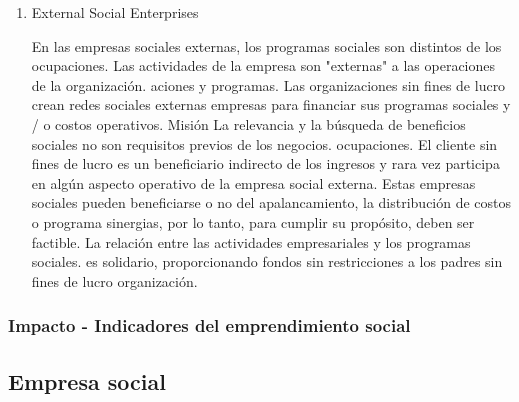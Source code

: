 \documentclass[11pt]{article}
\begin{document}
\begin{enumerate}
\item External Social Enterprises
\label{sec:orgd6ea4dd}

En las empresas sociales externas, los programas sociales son distintos de los
ocupaciones. Las actividades de la empresa son "externas" a las operaciones de la organización.
aciones y programas. Las organizaciones sin fines de lucro crean redes sociales externas
empresas para financiar sus programas sociales y / o costos operativos. Misión
La relevancia y la búsqueda de beneficios sociales no son requisitos previos de los negocios.
ocupaciones. El cliente sin fines de lucro es un beneficiario indirecto de los ingresos y
rara vez participa en algún aspecto operativo de la empresa social externa.
Estas empresas sociales pueden beneficiarse o no del apalancamiento, la distribución de costos
o programa sinergias, por lo tanto, para cumplir su propósito, deben ser
factible. La relación entre las actividades empresariales y los programas sociales.
es solidario, proporcionando fondos sin restricciones a los padres sin fines de lucro
organización.
\end{enumerate}

\subsubsection{Impacto - Indicadores del emprendimiento social}
\label{sec:org09e08a8}


\subsection{Empresa social}
\label{sec:orgceece02}
\end{document}

